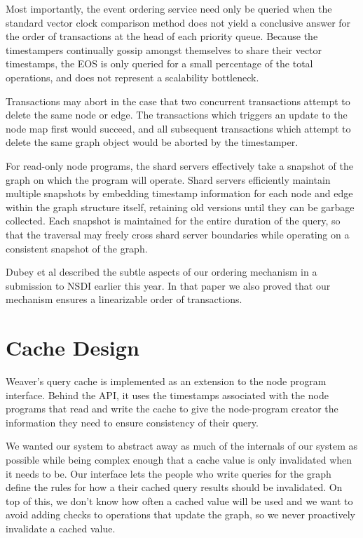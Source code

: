 \documentclass[letterpaper,twocolumn,11pt,tight]{article}
\begin{document}
Most importantly, the event ordering service need only be queried when
    the standard vector clock comparison method does not yield a conclusive
    answer for the order of transactions at the head of each priority queue.
Because the timestampers continually gossip amongst themselves to share
    their vector timestamps, the EOS is only queried for a small percentage of
    the total operations, and does not represent a scalability bottleneck.

Transactions may abort in the case that two concurrent transactions attempt
    to delete the same node or edge.
The transactions which triggers an update to the node map first would succeed,
    and all subsequent transactions which attempt to delete the same graph
    object would be aborted by the timestamper.

For read-only node programs, the shard servers effectively take a snapshot
    of the graph on which the program will operate.
Shard servers efficiently maintain multiple snapshots by embedding timestamp
    information for each node and edge within the graph structure itself,
    retaining old versions until they can be garbage collected.
Each snapshot is maintained for the entire duration of the query, so that the
    traversal may freely cross shard server boundaries while operating on
    a consistent snapshot of the graph.

Dubey et al described the subtle aspects of our ordering mechanism in a submission to NSDI earlier this year. In that paper we also proved that our mechanism ensures a linearizable order of transactions.

\section{Cache Design}\label{sec:cdesign}
Weaver's query cache is implemented as an extension to the node program interface. Behind the API, it uses the timestamps associated with the node programs that read and write the cache to give the node-program creator the information they need to ensure consistency of their query.

We wanted our system to abstract away as much of the internals of our system as possible while being complex enough that a cache value is only invalidated when it needs to be.
Our interface lets the people who write queries for the graph define the rules for how a their cached query results should be invalidated.
On top of this, we don't know how often a cached value will be used and we want to avoid adding checks to operations that update the graph, so we never proactively invalidate a cached value.
\end{document}
